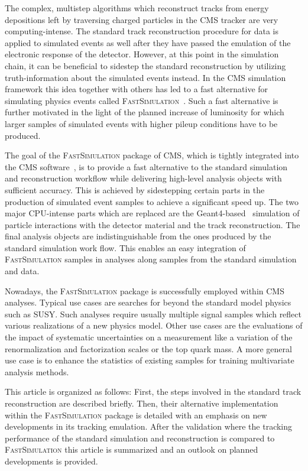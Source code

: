 \documentclass[a4paper]{jpconf}
\begin{document}
The complex, multistep algorithms which reconstruct tracks from energy depositions left by traversing charged particles in the CMS tracker are very computing-intense. The standard track reconstruction procedure for data is applied to simulated events as well after they have passed the emulation of the electronic response of the detector. However, at this point in the simulation chain, it can be beneficial to sidestep the standard reconstruction by utilizing truth-information about the simulated events instead. In the CMS simulation framework this idea together with others has led to a fast alternative for simulating physics events called \textsc{FastSimulation}~\cite{fsim1,fsim2}. Such a fast alternative is further motivated in the light of the planned increase of luminosity for which larger samples of simulated events with higher pileup conditions have to be produced.

The goal of the \textsc{FastSimulation} package of CMS, which is tightly integrated into the CMS software~\cite{cmssw}, is to provide a fast alternative to the standard simulation and reconstruction workflow while delivering high-level analysis objects with sufficient accuracy. This is achieved by sidestepping certain parts in the production of simulated event samples to achieve a significant speed up. The two major CPU-intense parts which are replaced are the Geant4-based~\cite{geant4} simulation of particle interactions with the detector material and the track reconstruction. The final analysis objects are indistinguishable from the ones produced by the standard simulation work flow. This enables an easy integration of \textsc{FastSimulation} samples in analyses along samples from the standard simulation and data.

Nowadays, the \textsc{FastSimulation} package is successfully employed within CMS analyses. Typical use cases are searches for beyond the standard model physics such as SUSY. Such analyses require usually multiple signal samples which reflect various realizations of a new physics model. Other use cases are the evaluations of the impact of systematic uncertainties on a measurement like a variation of the renormalization and factorization scales or the top quark mass. A more general use case is to enhance the statistics of existing samples for training multivariate analysis methods.

This article is organized as follows: First, the steps involved in the standard track reconstruction are described briefly. Then, their alternative implementation within the \textsc{FastSimulation} package is detailed with an emphasis on new developments in its tracking emulation. After the validation where the tracking performance of the standard simulation and reconstruction is compared to \textsc{FastSimulation} this article is summarized and an outlook on planned developments is provided.
\end{document}
